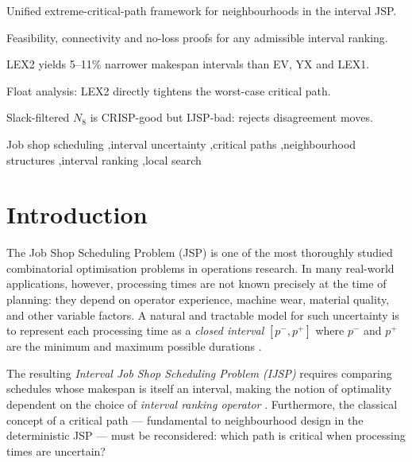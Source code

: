 \documentclass[preprint,12pt]{elsarticle}
\begin{document}
\begin{frontmatter}
\begin{highlights}
\item Unified extreme-critical-path framework for neighbourhoods in the interval JSP.
\item Feasibility, connectivity and no-loss proofs for any admissible interval ranking.
\item LEX2 yields 5--11\% narrower makespan intervals than EV, YX and LEX1.
\item Float analysis: LEX2 directly tightens the worst-case critical path.
\item Slack-filtered $N_8$ is CRISP-good but IJSP-bad: rejects disagreement moves.
\end{highlights}

\begin{keyword}
Job shop scheduling \sep interval uncertainty \sep critical paths \sep neighbourhood structures \sep interval ranking \sep local search
\end{keyword}

\end{frontmatter}


\section{Introduction}
\label{sec1}

The Job Shop Scheduling Problem (JSP) is one of the most thoroughly studied combinatorial optimisation problems in operations research. In many real-world applications, however, processing times are not known precisely at the time of planning: they depend on operator experience, machine wear, material quality, and other variable factors. A natural and tractable model for such uncertainty is to represent each processing time as a \emph{closed interval} $[p^-, p^+]$ where $p^-$ and $p^+$ are the minimum and maximum possible durations \cite{Moore2009,GonzalezRodriguez2008,Lei2012c}.

The resulting \emph{Interval Job Shop Scheduling Problem (IJSP)} requires comparing schedules whose makespan is itself an interval, making the notion of optimality dependent on the choice of \emph{interval ranking operator} \cite{Bustince2013,Karmakar2012}. Furthermore, the classical concept of a critical path --- fundamental to neighbourhood design in the deterministic JSP \cite{vanLaarhoven1992,Nowicki1996,Nowicki2005} --- must be reconsidered: which path is critical when processing times are uncertain?
\end{document}
